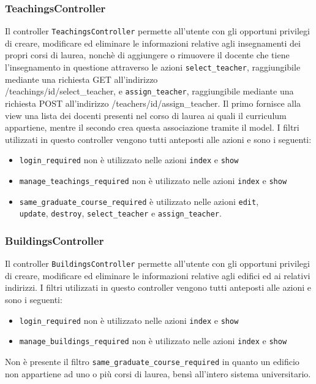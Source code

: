 \documentclass[11pt,a4paper]{article}
\begin{document}
\subsubsection{TeachingsController}
Il controller \verb|TeachingsController| permette all'utente con gli opportuni privilegi di creare, modificare ed eliminare le informazioni relative agli insegnamenti dei propri corsi di laurea, nonchè di aggiungere o rimuovere il docente che tiene l'insegnamento in questione attraverso le azioni \verb|select_teacher|, raggiungibile mediante una richiesta GET all'indirizzo \\ /teachings/id/select\_teacher, e \verb|assign_teacher|, raggiungibile mediante una richiesta POST all'indirizzo /teachers/id/assign\_teacher. Il primo fornisce alla view una lista dei docenti presenti nel corso di laurea ai quali il curriculum appartiene, mentre il secondo crea questa associazione tramite il model.
I filtri utilizzati in questo controller vengono tutti anteposti alle azioni e sono i seguenti:
\begin{itemize}
 \item \verb|login_required| non è utilizzato nelle azioni \verb|index| e \verb|show|
 \item \verb|manage_teachings_required| non è utilizzato nelle azioni \verb|index| e \verb|show|
 \item \verb|same_graduate_course_required| è utilizzato nelle azioni \verb|edit|,\\ \verb|update|, \verb|destroy|, \verb|select_teacher| e \verb|assign_teacher|.
\end{itemize}
\subsubsection{BuildingsController}
Il controller \verb|BuildingsController| permette all'utente con gli opportuni privilegi di creare, modificare ed eliminare le informazioni relative agli edifici ed ai relativi indirizzi.
I filtri utilizzati in questo controller vengono tutti anteposti alle azioni e sono i seguenti:
\begin{itemize}
 \item \verb|login_required| non è utilizzato nelle azioni \verb|index| e \verb|show|
 \item \verb|manage_buildings_required| non è utilizzato nelle azioni \verb|index| e \verb|show|
\end{itemize}
Non è presente il filtro \verb|same_graduate_course_required| in quanto un edificio non appartiene ad uno o più corsi di laurea, bensì all'intero sistema universitario.
\end{document}
